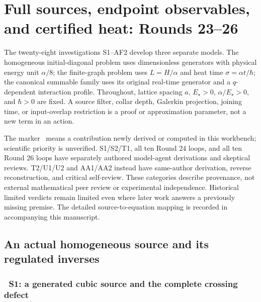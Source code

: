 \section{Full sources, endpoint observables, and certified heat: Rounds 23--26}
\label{sec:recent}

The twenty-eight investigations S1--AF2 develop three separate models.  The
homogeneous initial-diagonal problem uses dimensionless generators with physical
energy unit $\alpha/8$; the finite-graph problem uses $L=H/\alpha$ and heat time
$\sigma=\alpha t/\hbar$; the canonical summable family uses its original real-time
generator and a $q$-dependent interaction profile.  Throughout, lattice spacing
$a$, $E_\star>0$, $\alpha/E_\star>0$, and $\hbar>0$ are fixed.  A source filter,
collar depth, Galerkin projection, joining time, or input-overlap restriction is a
proof or approximation parameter, not a new term in an action.

The marker \workstar\ means a contribution newly derived or computed in this
workbench; scientific priority is unverified.  S1/S2/T1, all ten Round 24 loops,
and all ten Round 26 loops have separately authored model-agent derivations and
skeptical reviews.  T2/U1/U2 and AA1/AA2 instead have same-author derivation,
reverse reconstruction, and critical self-review.  These categories describe
provenance, not external mathematical peer review or experimental independence.
Historical limited verdicts remain limited even where later work answers a
previously missing premise.  The detailed source-to-equation mapping is recorded
in  accompanying this manuscript.

\subsection{An actual homogeneous source and its regulated inverses}
\label{recent:homogeneous}

\subsubsection{\workstar\ S1: a generated cubic source and the complete crossing defect}

